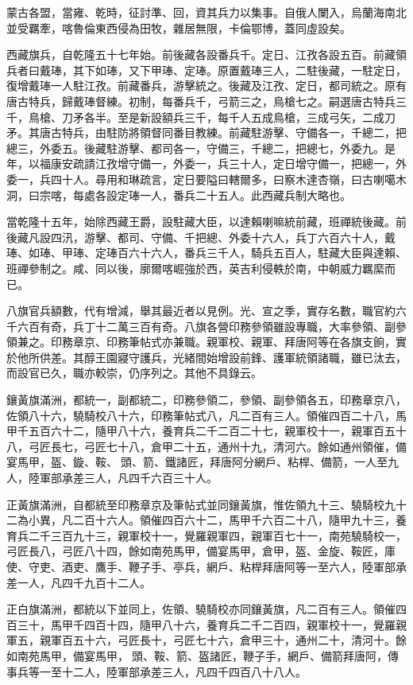 \begin{pinyinscope}
蒙古各盟，當雍、乾時，征討準、回，資其兵力以集事。自俄人闌入，烏蘭海南北並受羈牽，喀魯倫東西侵為田牧，雜居無限，卡倫鄂博，蓋同虛設矣。

西藏旗兵，自乾隆五十七年始。前後藏各設番兵千。定日、江孜各設五百。前藏領兵者曰戴琫，其下如琫，又下甲琫、定琫。原置戴琫三人，二駐後藏，一駐定日，復增戴琫一人駐江孜。前藏番兵，游擊統之。後藏及江孜、定日，都司統之。原有唐古特兵，歸戴琫督練。初制，每番兵千，弓箭三之，鳥槍七之。嗣選唐古特兵三千，鳥槍、刀矛各半。至是新設額兵三千，每千人五成鳥槍，三成弓矢，二成刀矛。其唐古特兵，由駐防將領督同番目教練。前藏駐游擊、守備各一，千總二，把總三，外委五。後藏駐游擊、都司各一，守備三，千總二，把總七，外委九。是年，以福康安疏請江孜增守備一，外委一，兵三十人，定日增守備一，把總一，外委一，兵四十人。尋用和琳疏言，定日要隘曰轄爾多，曰察木達杏嶺，曰古喇噶木洞，曰宗喀，每處各設定琫一人，番兵二十五人。此西藏兵制大略也。

當乾隆十五年，始除西藏王爵，設駐藏大臣，以達賴喇嘛統前藏，班禪統後藏。前後藏凡設四汛，游擊、都司、守備、千把總、外委十六人，兵丁六百六十人，戴琫、如琫、甲琫、定琫百六十六人，番兵三千人，騎兵五百人，駐藏大臣與達賴、班禪參制之。咸、同以後，廓爾喀崛強於西，英吉利侵軼於南，中朝威力羈縻而已。

八旗官兵額數，代有增減，舉其最近者以見例。光、宣之季，實存名數，職官約六千六百有奇，兵丁十二萬三百有奇。八旗各營印務參領雖設專職，大率參領、副參領兼之。印務章京、印務筆帖式亦兼職。親軍校、親軍、拜唐阿等在各旗支餉，實於他所供差。其醇王園寢守護兵，光緒間始增設前鋒、護軍統領諸職，雖已汰去，而設官已久，職亦較崇，仍序列之。其他不具錄云。

鑲黃旗滿洲，都統一，副都統二，印務參領二，參領、副參領各五，印務章京八，佐領八十六，驍騎校八十六，印務筆帖式八，凡二百有三人。領催四百二十八，馬甲千五百六十二，隨甲八十六，養育兵二千二百二十七，親軍校十一，親軍百五十八，弓匠長七，弓匠七十八，倉甲二十五，通州十九，清河六。餘如通州領催，備宴馬甲，盔、鏇、鞍、頭、箭、鐵諸匠，拜唐阿分網戶、粘桿、備箭，一人至九人，陸軍部承差三人，凡四千六百三十人。

正黃旗滿洲，自都統至印務章京及筆帖式並同鑲黃旗，惟佐領九十三、驍騎校九十二為小異，凡二百十六人。領催四百六十二，馬甲千六百二十八，隨甲九十三，養育兵二千三百九十三，親軍校十一，覺羅親軍四，親軍百七十一，南苑驍騎校一，弓匠長八，弓匠八十四，餘如南苑馬甲，備宴馬甲，倉甲，盔、金旋、鞍匠，庫使、守吏、酒吏、鷹手、鞭子手、亭兵，網戶、粘桿拜唐阿等一至六人，陸軍部承差一人，凡四千九百十二人。

正白旗滿洲，都統以下並同上，佐領、驍騎校亦同鑲黃旗，凡二百有三人。領催四百三十，馬甲千四百十四，隨甲八十六，養育兵二千二百四，親軍校十一，覺羅親軍五，親軍百五十六，弓匠長十，弓匠七十六，倉甲三十，通州二十，清河十。餘如南苑馬甲，備宴馬甲，頭、鞍、箭、盔諸匠，鞭子手，網戶、備箭拜唐阿，傳事兵等一至十二人，陸軍部承差三人，凡四千四百八十八人。


\end{pinyinscope}
